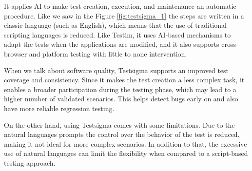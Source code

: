 It applies AI to make test creation, execution, and maintenance an automatic procedure. Like we saw in the Figure \ref{fig:testsigma_1} the steps are written in a classic language (such as English), which means that the use of traditional scripting languages is reduced. Like Testim, it uses AI-based mechanisms to adapt the tests when the applications are modified, and it also supports cross-browser and platform testing with little to none intervention. \cite{testsigma}

When we talk about software quality, Testsigma supports an improved test coverage and consistency. Since it makes the test creation a less complex task, it enables a broader participation during the testing phase, which may lead to a higher number of validated scenarios. This helps detect bugs early on and also have more reliable regression testing.

On the other hand, using Testsigma comes with some limitations. Due to the natural languages prompts the control over the behavior of the test is reduced, making it not ideal for more complex scenarios. In addition to that, the excessive use of natural languages can limit the flexibility when compared to a script-based testing approach.